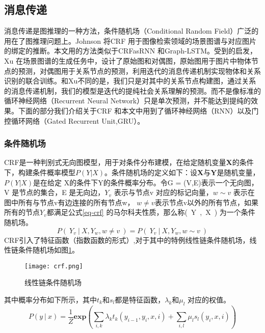 
\subsection{消息传递}

消息传递是图推理的一种方法，条件随机场（Conditional Random Field）广泛的用在了图推理问题上。Johnson\cite{johnson2015image} 将CRF 用于图像检索领域的场景图谱与对应图片的绑定的推断。本文用的方法类似于CRFasRNN\cite{zheng2015conditional} 和Graph-LSTM\cite{liang2016semantic}。受到\cite{xu2017scene}的启发，Xu 在场景图谱的生成任务中，设计了原始图和对偶图，原始图用于图片中物体节点的预测，对偶图用于关系节点的预测，利用迭代的消息传递机制实现物体和关系识别的联合训练。和Xu不同的是，我们只是对其中的关系节点构建图，通过关系的消息传递机制，我们的模型是迭代的提纯社会关系理解的预测。而不是像标准的循环神经网络（Recurrent Neural Network）只是单次预测，并不能达到提纯的效果。下面的部分我们介绍关于CRF 和本文中用到了循环神经网络（RNN）以及门控循环网络（Gated Recurrent Unit,GRU）。

\subsubsection{条件随机场}
CRF是一种判别式无向图模型，用于对条件分布建模，在给定随机变量\textbf{X}的条件下，构建条件概率模型$P(Y | X)$。条件随机场的定义如下：设\textbf{X}与\textbf{Y}是随机变量，$P(Y|X)$是在给定
X的条件下Y的条件概率分布。令G = (V,E)表示一个无向图，V 是节点的集合，E 是无向边，$Y_{v}$ 表示与节点v 对应的标记向量，$w \sim v$ 表示在图中所有与节点v有边连接的所有节点w，
$w \neq v$表示节点v以外的所有节点，如果所有的节点$Y_v$都满足公式\ref{eq-crf}  的马尔科夫性质，那么称(~Y~,~X~) 为一个条件随机场。
\begin{equation} \label{eq-crf}
    P(~Y_{v}~|~X,Y_w,w \neq v~) = P(~Y_v~|~X,Y_w,w \sim v~)
\end{equation}
CRF引入了特征函数（指数函数的形式）,对于其中的特例线性链条件随机场，线性链条件随机场如图\ref{fig:crf}。
\begin{figure}[htpb]
	\centering
	\texttt{[image: crf.png]}
    \caption{线性链条件随机场}
	\vspace*{-3.5mm}
	\label{fig:crf}
\end{figure}
其中概率分布如下所示，其中$t_{k}$和$s_{l}$都是特征函数，$\lambda_{k}$和$\mu_{l}$ 对应的权值。
\begin{equation}
    P(y~|~x) = \frac{1}{Z}\mathbf{exp}(\sum_{i,k}\lambda_{k}t_{k}(y_{i-1},y_{i},x,i)+\sum_{i,l}\mu_{l}s_{l}(y_{i},x,i))
\end{equation}


